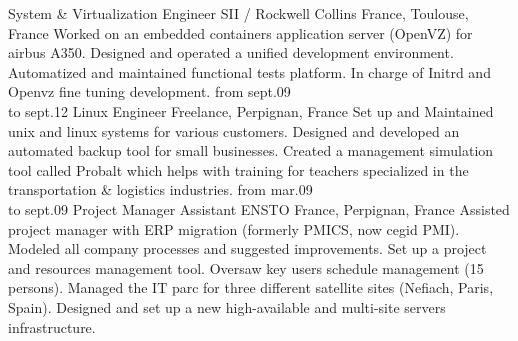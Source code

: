 \documentclass[]{friggeri-cv}
\begin{document}
\begin{entrylist}
        {System \& Virtualization Engineer}
        {SII / Rockwell Collins France, Toulouse, France}
        {Worked on an embedded containers application server (OpenVZ) for airbus A350.
        Designed and operated a unified development environment.
        Automatized and maintained functional tests platform.
        In charge of Initrd and Openvz fine tuning development.
        }
    \entry
        {from sept.09\\to sept.12}
        {Linux Engineer}
        {Freelance, Perpignan, France}
        {Set up and Maintained unix and linux systems for various customers.
        Designed and developed an automated backup tool for small businesses.
	Created a management simulation tool called Probalt which helps with training
	for teachers specialized in the transportation \& logistics industries.
        }
    \entry
        {from mar.09\\to sept.09}
        {Project Manager Assistant}
        {ENSTO France, Perpignan, France}
        {Assisted project manager with ERP migration (formerly PMICS, now cegid PMI).
        Modeled all company processes and suggested improvements.
        Set up a project and resources management tool.
        Oversaw key users schedule management (15 persons).
        Managed the IT parc for three different satellite sites (Nefiach, Paris, Spain).
        Designed and set up a new high-available and multi-site servers infrastructure.
        }
\end{entrylist}
\end{document}
